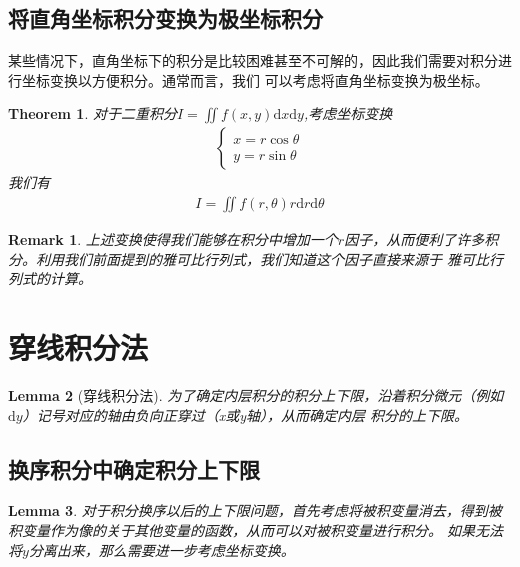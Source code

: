 \documentclass[12pt,a4paper,UTF8]{ctexbook}
\theoremstyle{plain}
\newtheorem{theorem}{\indent Theorem}[section]
\newtheorem{lemma}[theorem]{\indent Lemma}
\newtheorem{remark}{\indent Remark}[section]
\begin{document}
\subsection{将直角坐标积分变换为极坐标积分}
某些情况下，直角坐标下的积分是比较困难甚至不可解的，因此我们需要对积分进行坐标变换以方便积分。通常而言，我们
可以考虑将直角坐标变换为极坐标。
\begin{theorem}
    对于二重积分$I=\iint f(x,y)\mathrm d x\mathrm d y$,考虑坐标变换
    \begin{align*} 
        \left \{\begin{array}{lc}x=r\cos\theta\\y=r\sin \theta\end{array}\right.
    \end{align*}
    我们有 
    \begin{align*} 
        I=\iint f(r,\theta) r\mathrm d r\mathrm d \theta
    \end{align*}
\end{theorem}
\begin{remark}
上述变换使得我们能够在积分中增加一个$r$因子，从而便利了许多积分。利用我们前面提到的雅可比行列式，我们知道这个因子直接来源于
雅可比行列式的计算。
\end{remark}
\section{穿线积分法}
\begin{lemma}[穿线积分法]
为了确定内层积分的积分上下限，沿着积分微元（例如$\mathrm d y$）记号对应的轴由负向正穿过（x或y轴），从而确定内层
积分的上下限。
\end{lemma}
\subsection{换序积分中确定积分上下限}
\begin{lemma}
    对于积分换序以后的上下限问题，首先考虑将被积变量消去，得到被积变量作为像的关于其他变量的函数，从而可以对被积变量进行积分。
    如果无法将$y$分离出来，那么需要进一步考虑坐标变换。
\end{lemma}
\end{document}
